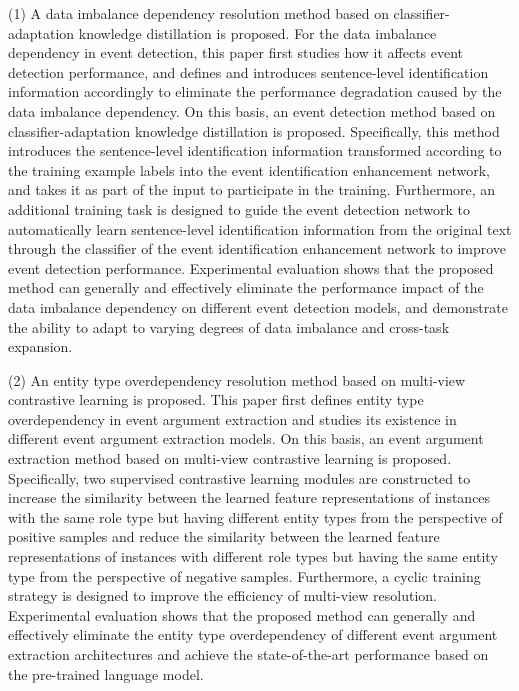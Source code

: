 \begin{englishabstract}
(1) A data imbalance dependency resolution method based on classifier-adaptation knowledge distillation is proposed. For the data imbalance dependency in event detection, this paper first studies how it affects event detection performance, and defines and introduces sentence-level identification information accordingly to eliminate the performance degradation caused by the data imbalance dependency. On this basis, an event detection method based on classifier-adaptation knowledge distillation is proposed. Specifically, this method introduces the sentence-level identification information transformed according to the training example labels into the event identification enhancement network, and takes it as part of the input to participate in the training. Furthermore, an additional training task is designed to guide the event detection network to automatically learn sentence-level identification information from the original text through the classifier of the event identification enhancement network to improve event detection performance. Experimental evaluation shows that the proposed method can generally and effectively eliminate the performance impact of the data imbalance dependency on different event detection models, and demonstrate the ability to adapt to varying degrees of data imbalance and cross-task expansion.

(2) An entity type overdependency resolution method based on multi-view contrastive learning is proposed. This paper first defines entity type overdependency in event argument extraction and studies its existence in different event argument extraction models. On this basis, an event argument extraction method based on multi-view contrastive learning is proposed. Specifically, two supervised contrastive learning modules are constructed to increase the similarity between the learned feature representations of instances with the same role type but having different entity types from the perspective of positive samples and reduce the similarity between the learned feature representations of instances with different role types but having the same entity type from the perspective of negative samples. Furthermore, a cyclic training strategy is designed to improve the efficiency of multi-view resolution. Experimental evaluation shows that the proposed method can generally and effectively eliminate the entity type overdependency of different event argument extraction architectures and achieve the state-of-the-art performance based on the pre-trained language model.


\end{englishabstract}
